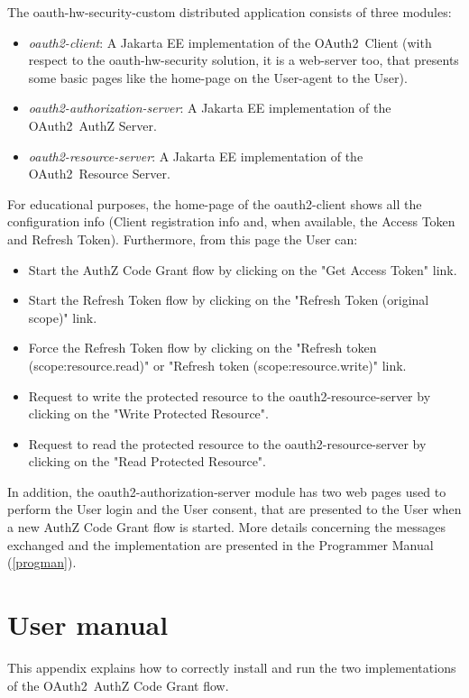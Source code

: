 \documentclass[a4paper,12pt]{article}
\def\oauth{OAuth2\xspace}
\begin{document}
The oauth-hw-security-custom distributed application consists of three modules:

\begin{itemize}
    \item \textit{oauth2-client}: A Jakarta EE implementation of the \oauth\ Client (with respect to the oauth-hw-security solution, it is a web-server too, that presents some basic pages like the home-page on the User-agent to the User).
    \item \textit{oauth2-authorization-server}: A Jakarta EE implementation of the \oauth\ AuthZ Server.
    \item \textit{oauth2-resource-server}: A Jakarta EE implementation of the \oauth\ Resource Server.
\end{itemize}

For educational purposes, the home-page of the oauth2-client shows all the configuration info (Client registration info and, when available, the Access Token and Refresh Token). Furthermore, from this page the User can:
\begin{itemize}
    \item Start the AuthZ Code Grant flow by clicking on the "Get Access Token" link.
    \item Start the Refresh Token flow by clicking on the "Refresh Token (original scope)" link.
    \item Force the Refresh Token flow by clicking on the "Refresh token (scope:resource.read)" or "Refresh token (scope:resource.write)" link.
    \item Request to write the protected resource to the oauth2-resource-server by clicking on the "Write Protected Resource".
    \item Request to read the protected resource to the oauth2-resource-server by clicking on the "Read Protected Resource".
\end{itemize}

In addition, the oauth2-authorization-server module has two web pages used to perform the User login and the User consent, that are presented to the User when a new AuthZ Code Grant flow is started.
More details concerning the messages exchanged and the implementation are presented in the Programmer Manual (\ref{progman}).

\appendix
\section{User manual}
This appendix explains how to correctly install and run the two implementations of the \oauth\ AuthZ Code Grant flow.
\end{document}
